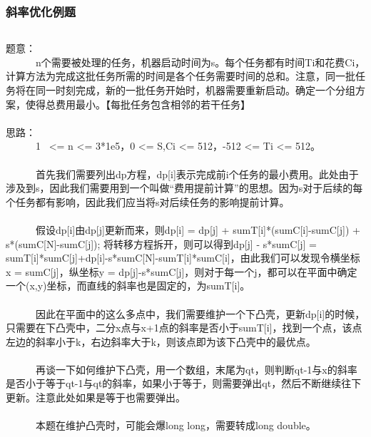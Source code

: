 \documentclass[twoside]{article}
\begin{document}
\subsubsection{斜率优化例题}
\begin{lstlisting}
\end{lstlisting}
题意：\\
       n个需要被处理的任务，机器启动时间为s。每个任务都有时间Ti和花费Ci，计算方法为完成这批任务所需的时间是各个任务需要时间的总和。注意，同一批任务将在同一时刻完成，新的一批任务开始时，机器需要重新启动。确定一个分组方案，使得总费用最小。【每批任务包含相邻的若干任务】\\
\\
思路：\\
       1  <= n <= 3*1e5，0 <= S,Ci <= 512，-512 <= Ti <= 512。\\
\\
       首先我们需要列出dp方程，dp[i]表示完成前i个任务的最小费用。此处由于涉及到s，因此我们需要用到一个叫做“费用提前计算”的思想。因为s对于后续的每个任务都有影响，因此我们应当将s对后续任务的影响提前计算。\\
\\
       假设dp[i]由dp[j]更新而来，则dp[i] = dp[j] + sumT[i]*(sumC[i]-sumC[j]) + s*(sumC[N]-sumC[j]); 将转移方程拆开，则可以得到dp[j] - s*sumC[j] = sumT[i]*sumC[j]+dp[i]-s*sumC[N]-sumT[i]*sumC[i]，由此我们可以发现令横坐标x = sumC[j]，纵坐标y = dp[j]-s*sumC[j]，则对于每一个j，都可以在平面中确定一个(x,y)坐标，而直线的斜率也是固定的，为sumT[i]。\\
\\
       因此在平面中的这么多点中，我们需要维护一个下凸壳，更新dp[i]的时候，只需要在下凸壳中，二分x点与x+1点的斜率是否小于sumT[i]，找到一个点，该点左边的斜率小于k，右边斜率大于k，则该点即为该下凸壳中的最优点。\\
\\
       再谈一下如何维护下凸壳，用一个数组，末尾为qt，则判断qt-1与x的斜率是否小于等于qt-1与qt的斜率，如果小于等于，则需要弹出qt，然后不断继续往下更新。注意此处如果是等于也需要弹出。\\
\\
       本题在维护凸壳时，可能会爆long long，需要转成long double。\\
\end{document}
